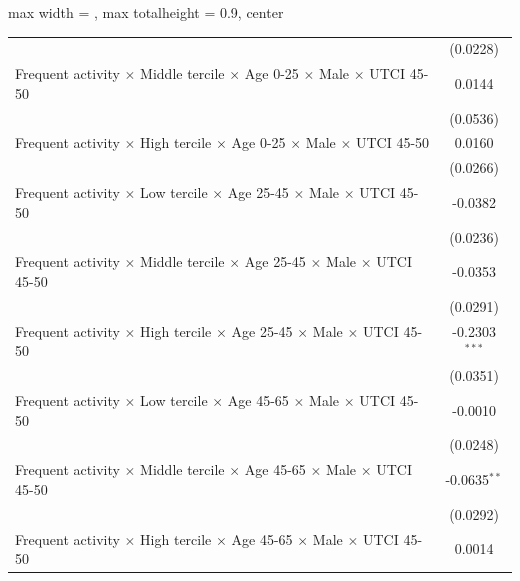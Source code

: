 \begin{table}[htbp]
\begin{adjustbox}{max width = \textwidth, max totalheight = 0.9\textheight, center}
\begin{tabular}{lc}
                                                                                                               & (0.0228)\\   
         Frequent activity $\times$ Middle tercile $\times$ Age 0-25 $\times$ Male $\times$ UTCI 45-50         & 0.0144\\   
                                                                                                               & (0.0536)\\   
         Frequent activity $\times$ High tercile $\times$ Age 0-25 $\times$ Male $\times$ UTCI 45-50           & 0.0160\\   
                                                                                                               & (0.0266)\\   
         Frequent activity $\times$ Low tercile $\times$ Age 25-45 $\times$ Male $\times$ UTCI 45-50           & -0.0382\\   
                                                                                                               & (0.0236)\\   
         Frequent activity $\times$ Middle tercile $\times$ Age 25-45 $\times$ Male $\times$ UTCI 45-50        & -0.0353\\   
                                                                                                               & (0.0291)\\   
         Frequent activity $\times$ High tercile $\times$ Age 25-45 $\times$ Male $\times$ UTCI 45-50          & -0.2303$^{***}$\\   
                                                                                                               & (0.0351)\\   
         Frequent activity $\times$ Low tercile $\times$ Age 45-65 $\times$ Male $\times$ UTCI 45-50           & -0.0010\\   
                                                                                                               & (0.0248)\\   
         Frequent activity $\times$ Middle tercile $\times$ Age 45-65 $\times$ Male $\times$ UTCI 45-50        & -0.0635$^{**}$\\   
                                                                                                               & (0.0292)\\   
         Frequent activity $\times$ High tercile $\times$ Age 45-65 $\times$ Male $\times$ UTCI 45-50          & 0.0014\\   

\end{tabular}
\end{adjustbox}
\end{table}
